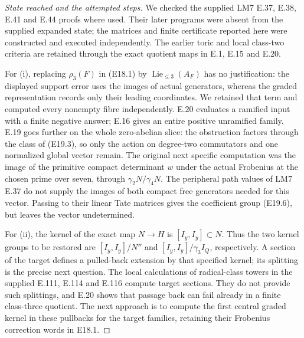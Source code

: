 \documentclass[11pt,oneside]{article}
\begin{document}
\begin{proof}[State reached and the attempted steps]
We checked the supplied LM7 E.37, E.38, E.41
and E.44 proofs where used. Their later programs
were absent from the supplied expanded state;
the matrices and finite certificate reported
here were constructed and executed independently.
The earlier toric and local class-two criteria
are retained through the exact quotient maps
in E.1, E.15 and E.20.

For (i), replacing $\rho_3(F)$ in (E18.1)
by $\operatorname{Lie}_{\le3}(A_F)$ has no
justification: the displayed support error
uses the images of actual generators, whereas
the graded representation records only their
leading coordinates. We retained that term
and computed every nonempty fibre independently.
E.20 evaluates a ramified input with a finite
negative answer; E.16 gives an entire positive
unramified family. E.19 goes further on the
whole zero-abelian slice: the obstruction
factors through the class of (E19.3), so only
the action on degree-two commutators and one
normalized global vector remain. The original next
specific computation was the image of the
primitive compact determinant $w$ under the
actual Frobenius at the chosen prime over
seven, through $\gamma_2N/\gamma_4N$.
The peripheral path values of LM7 E.37
do not supply the images of both compact
free generators needed for this vector.
Passing to their linear Tate matrices gives
the coefficient group (E19.6), but leaves
the vector undetermined.

For (ii), the kernel of the exact map
$N\to H$ is $[I_y,I_y]\subset N$.
Thus the two kernel groups to be restored are
$[I_y,I_y]/N''$ and
$[I_y,I_y]/\gamma_3I_Q$, respectively.
A section of the target defines a pulled-back
extension by that specified kernel; its
splitting is the precise next question.
The local calculations of radical-class
towers in the supplied E.111, E.114 and
E.116 compute target sections. They do
not provide such splittings, and E.20
shows that passage back can fail already
in a finite class-three quotient.
The next approach is to compute the first
central graded kernel in these pullbacks
for the target families, retaining their
Frobenius correction words in E18.1.


\end{proof}
\end{document}

